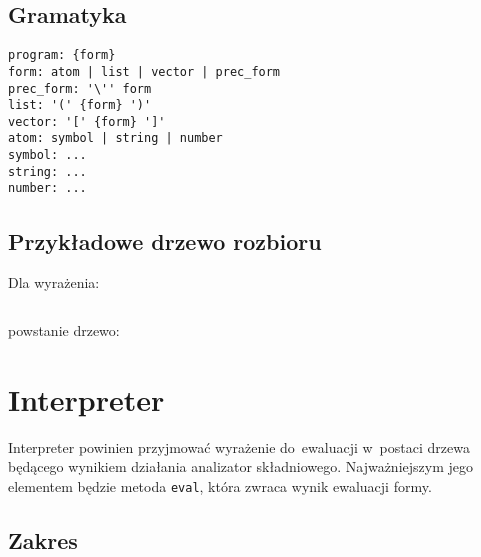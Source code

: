 \documentclass[a4paper,11pt]{article}
\newcommand{\clj}[1]{\inputminted[fontsize=\footnotesize]{clojure}{code/#1.clj}}
\begin{document}
\subsection{Gramatyka}

\begin{verbatim}
program: {form}
form: atom | list | vector | prec_form
prec_form: '\'' form
list: '(' {form} ')'
vector: '[' {form} ']'
atom: symbol | string | number
symbol: ...
string: ...
number: ...
\end{verbatim}


\subsection{Przykładowe drzewo rozbioru}

Dla wyrażenia:
\clj{fact}

powstanie drzewo:


\section{Interpreter}

Interpreter powinien przyjmować wyrażenie do~ewaluacji w~postaci drzewa
będącego wynikiem działania analizator składniowego. Najważniejszym jego
elementem będzie metoda \verb+eval+, która zwraca wynik ewaluacji formy.

\subsection{Zakres}
\end{document}
